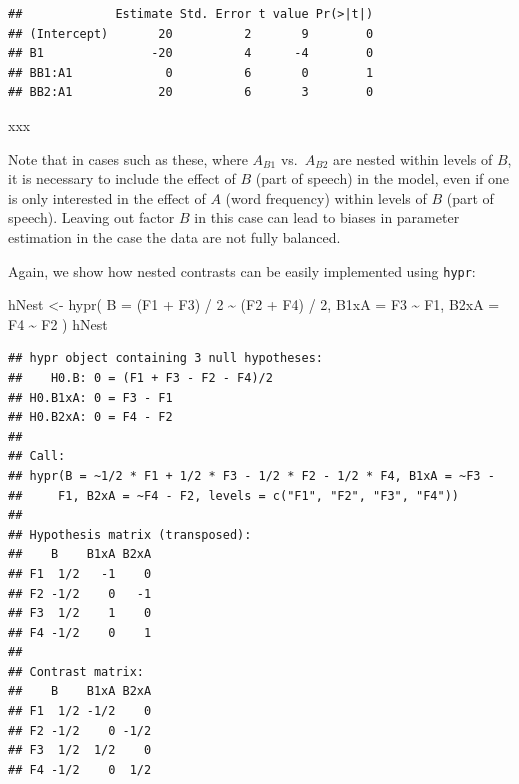 \documentclass[
  12pt,
]{krantz}
\newenvironment{Shaded}{\begin{snugshade}}{\end{snugshade}}
\newcommand{\AttributeTok}[1]{\textcolor[rgb]{0.77,0.63,0.00}{#1}}
\newcommand{\DecValTok}[1]{\textcolor[rgb]{0.00,0.00,0.81}{#1}}
\newcommand{\FunctionTok}[1]{\textcolor[rgb]{0.00,0.00,0.00}{#1}}
\newcommand{\NormalTok}[1]{#1}
\newcommand{\OtherTok}[1]{\textcolor[rgb]{0.56,0.35,0.01}{#1}}
\newcommand{\SpecialCharTok}[1]{\textcolor[rgb]{0.00,0.00,0.00}{#1}}
\theoremstyle{definition}
\theoremstyle{definition}
\theoremstyle{definition}
\theoremstyle{definition}
\theoremstyle{remark}
\begin{document}
\begin{Shaded}
\end{Shaded}

\begin{verbatim}
##             Estimate Std. Error t value Pr(>|t|)
## (Intercept)       20          2       9        0
## B1               -20          4      -4        0
## BB1:A1             0          6       0        1
## BB2:A1            20          6       3        0
\end{verbatim}

xxx

Note that in cases such as these, where \(A_{B1}\) vs.~\(A_{B2}\) are nested within levels of \(B\), it is necessary to include the effect of \(B\) (part of speech) in the model, even if one is only interested in the effect of \(A\) (word frequency) within levels of \(B\) (part of speech). Leaving out factor \(B\) in this case can lead to biases in parameter estimation in the case the data are not fully balanced.

Again, we show how nested contrasts can be easily implemented using \texttt{hypr}:

\begin{Shaded}
\begin{Highlighting}[]
\NormalTok{hNest }\OtherTok{\textless{}{-}} \FunctionTok{hypr}\NormalTok{(}
  \AttributeTok{B =}\NormalTok{ (F1 }\SpecialCharTok{+}\NormalTok{ F3) }\SpecialCharTok{/} \DecValTok{2} \SpecialCharTok{\textasciitilde{}}\NormalTok{ (F2 }\SpecialCharTok{+}\NormalTok{ F4) }\SpecialCharTok{/} \DecValTok{2}\NormalTok{,}
  \AttributeTok{B1xA =}\NormalTok{ F3 }\SpecialCharTok{\textasciitilde{}}\NormalTok{ F1,}
  \AttributeTok{B2xA =}\NormalTok{ F4 }\SpecialCharTok{\textasciitilde{}}\NormalTok{ F2}
\NormalTok{)}
\NormalTok{hNest}
\end{Highlighting}
\end{Shaded}

\begin{verbatim}
## hypr object containing 3 null hypotheses:
##    H0.B: 0 = (F1 + F3 - F2 - F4)/2
## H0.B1xA: 0 = F3 - F1
## H0.B2xA: 0 = F4 - F2
## 
## Call:
## hypr(B = ~1/2 * F1 + 1/2 * F3 - 1/2 * F2 - 1/2 * F4, B1xA = ~F3 - 
##     F1, B2xA = ~F4 - F2, levels = c("F1", "F2", "F3", "F4"))
## 
## Hypothesis matrix (transposed):
##    B    B1xA B2xA
## F1  1/2   -1    0
## F2 -1/2    0   -1
## F3  1/2    1    0
## F4 -1/2    0    1
## 
## Contrast matrix:
##    B    B1xA B2xA
## F1  1/2 -1/2    0
## F2 -1/2    0 -1/2
## F3  1/2  1/2    0
## F4 -1/2    0  1/2
\end{verbatim}
\end{document}
